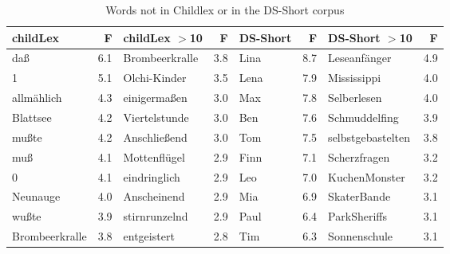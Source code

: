 \documentclass[manuscript]{stjour}
\begin{document}
\begin{table}[!htbp]
\caption{Words not in Childlex or in the DS-Short corpus}
\centering
\begin{tabular}{lrlrlrlr}
  \hline
childLex & F & childLex $>$10 & F & DS-Short & F & DS-Short $>$10 & F \\ 
  \hline
daß & 6.1 & Brombeerkralle & 3.8 & Lina & 8.7 & Leseanfänger & 4.9 \\ 
  1 & 5.1 & Olchi-Kinder & 3.5 & Lena & 7.9 & Mississippi & 4.0 \\ 
  allmählich & 4.3 & einigermaßen & 3.0 & Max & 7.8 & Selberlesen & 4.0 \\ 
  Blattsee & 4.2 & Viertelstunde & 3.0 & Ben & 7.6 & Schmuddelfing & 3.9 \\ 
  mußte & 4.2 & Anschließend & 3.0 & Tom & 7.5 & selbstgebastelten & 3.8 \\ 
  muß & 4.1 & Mottenflügel & 2.9 & Finn & 7.1 & Scherzfragen & 3.2 \\ 
  0 & 4.1 & eindringlich & 2.9 & Leo & 7.0 & KuchenMonster & 3.2 \\ 
  Neunauge & 4.0 & Anscheinend & 2.9 & Mia & 6.9 & SkaterBande & 3.1 \\ 
  wußte & 3.9 & stirnrunzelnd & 2.9 & Paul & 6.4 & ParkSheriffs & 3.1 \\ 
  Brombeerkralle & 3.8 & entgeistert & 2.8 & Tim & 6.3 & Sonnenschule & 3.1 \\ 
   \hline
\end{tabular}
\label{words-dssh}
\end{table}
\end{document}

